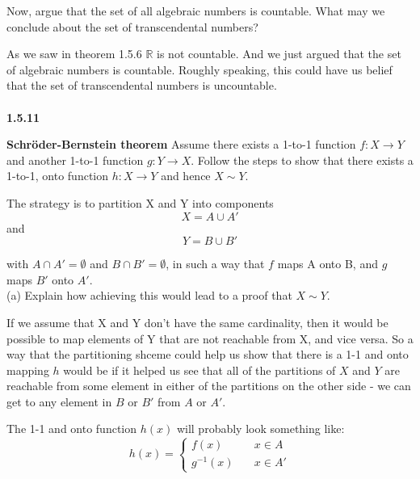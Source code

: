 Now, argue that the set of all algebraic numbers is countable.
What may  we conclude about the set of transcendental numbers?

As we saw in theorem 1.5.6 $\mathbb{R}$ is not countable.
And we just argued that the set of algebraic numbers is countable.
Roughly speaking, this could have us belief that the set of transcendental numbers is uncountable.
\\~\\



\textbf{1.5.11}

\textbf{Schröder-Bernstein theorem}
Assume there exists a 1-to-1 function $f: X \rightarrow Y$ and another 1-to-1 function $g: Y \rightarrow X$.
Follow the steps to show that there exists a 1-to-1, onto function $h: X \rightarrow Y$ and hence $X \sim Y$.

The strategy is to partition X and Y into components
$$
X = A \cup A'
$$
and
$$
Y = B \cup B'
$$

with $A \cap A' = \emptyset$ and $B \cap B' = \emptyset$, in such a way that $f$ maps A onto B,
and $g$ maps $B'$ onto $A'$.
\\

(a) Explain how achieving this would lead to a proof that $X \sim Y$.

If we assume that X and Y don't have the same cardinality, then it would be possible to map elements of Y
that are not reachable from X, and vice versa.
So a way that the partitioning shceme could help us show that there is a 1-1 and onto mapping $h$ would be
if it helped us see that all of the partitions of $X$ and $Y$ are reachable from some element in either of the
partitions on the other side - we can get to any element in $B$ or $B'$ from $A$ or $A'$.

The 1-1 and onto function $h(x)$ will probably look something like:
\begin{equation}
    h(x) =
      \begin{cases}
        f(x)       & \quad x \in A\\
        g^{-1}(x)  & \quad x \in A'
      \end{cases}
\end{equation}

